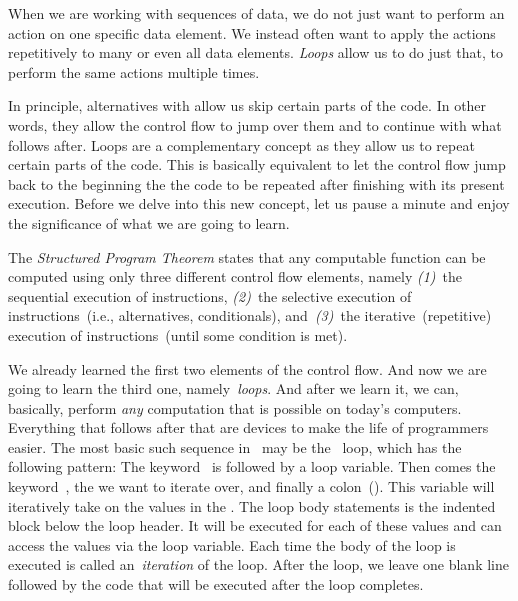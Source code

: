 %
%
When we are working with sequences of data, we do not just want to perform an action on one specific data element.
We instead often want to apply the actions repetitively to many or even all data elements.
\emph{Loops} allow us to do just that, to perform the same actions multiple times.

In principle, alternatives with  allow us skip certain parts of the code.
In other words, they allow the control flow to jump over them and to continue with what follows after.
Loops are a complementary concept as they allow us to repeat certain parts of the code.
This is basically equivalent to let the control flow jump back to the beginning the the code to be repeated after finishing with its present execution.
Before we delve into this new concept, let us pause a minute and enjoy the significance of what we are going to learn.%
%
\begin{definition}%
The \emph{Structured Program Theorem} states that any computable function can be computed using only three different control flow elements, namely \emph{(1)}~the sequential execution of instructions, \emph{(2)}~the selective execution of instructions~(i.e., alternatives, conditionals), and~\emph{(3)}~the iterative~(repetitive) execution of instructions~(until some condition is met).%
\end{definition}%
%
We already learned the first two elements of the control flow.
And now we are going to learn the third one, namely~\emph{loops}.
And after we learn it, we can, basically, perform \emph{any} computation that is possible on today's computers.
Everything that follows after that are devices to make the life of programmers easier.%
%
%
%
%
%
%
The most basic such sequence in \python\ may be the ~loop, which has the following pattern\cite{PSF:P3D:TPT:MCFT}:%
%
%
\FloatBarrier%
%
%
%
%
%
%
%
The keyword~ is followed by a loop variable.
Then comes the keyword~, the  we want to iterate over, and finally a colon~(\pythonilIdx{:}).
This variable will iteratively take on the values in the .
The loop body statements is the indented block below the loop header.
It will be executed for each of these values and can access the values via the loop variable.
Each time the body of the loop is executed is called an~\emph{iteration} of the loop.
After the loop, we leave one blank line followed by the code that will be executed after the loop completes.

